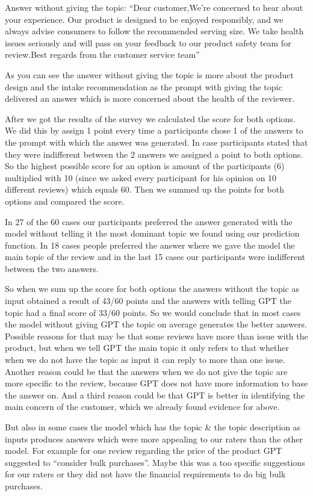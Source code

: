 \documentclass[
]{article}
\begin{document}
Answer without giving the topic: ``Dear customer,We're concerned to hear
about your experience. Our product is designed to be enjoyed
responsibly, and we always advise consumers to follow the recommended
serving size. We take health issues seriously and will pass on your
feedback to our product safety team for review.Best regards from the
customer service team''

As you can see the answer without giving the topic is more about the
product design and the intake recommendation as the prompt with giving
the topic delivered an answer which is more concerned about the health
of the reviewer.

After we got the results of the survey we calculated the score for both
options. We did this by assign 1 point every time a participants chose 1
of the answers to the prompt with which the answer was generated. In
case participants stated that they were indifferent between the 2
answers we assigned a point to both options. So the highest possible
score for an option is amount of the participants (6) multiplied with 10
(since we asked every participant for his opinion on 10 different
reviews) which equals 60. Then we summed up the points for both options
and compared the score.

In 27 of the 60 cases our participants preferred the answer generated
with the model without telling it the most dominant topic we found using
our prediction function. In 18 cases people preferred the answer where
we gave the model the main topic of the review and in the last 15 cases
our participants were indifferent between the two answers.

So when we sum up the score for both options the answers without the
topic as input obtained a result of 43/60 points and the answers with
telling GPT the topic had a final score of 33/60 points. So we would
conclude that in most cases the model without giving GPT the topic on
average generates the better answers. Possible reasons for that may be
that some reviews have more than issue with the product, but when we
tell GPT the main topic it only refers to that whether when we do not
have the topic as input it can reply to more than one issue. Another
reason could be that the answers when we do not give the topic are more
specific to the review, because GPT does not have more information to
base the answer on. And a third reason could be that GPT is better in
identifying the main concern of the customer, which we already found
evidence for above.

But also in some cases the model which has the topic \& the topic
description as inputs produces answers which were more appealing to our
raters than the other model. For example for one review regarding the
price of the product GPT suggested to ``consider bulk purchases''. Maybe
this was a too specific suggestions for our raters or they did not have
the financial requirements to do big bulk purchases.
\end{document}
